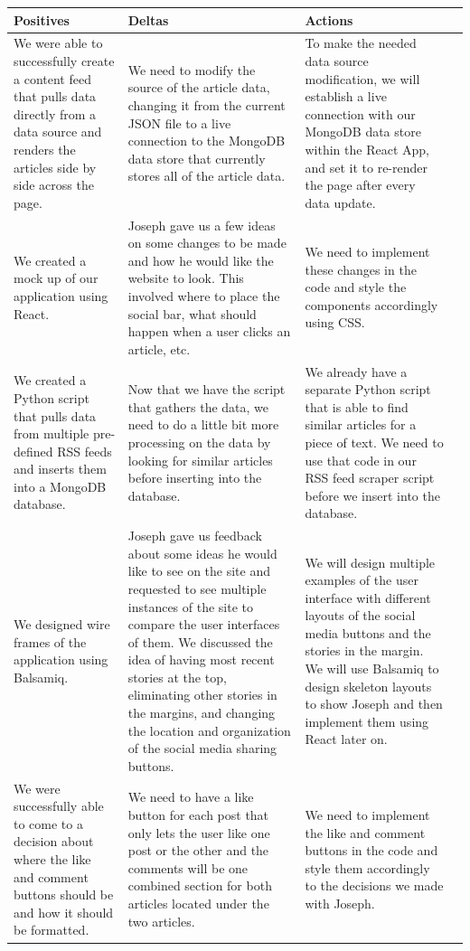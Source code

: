 \documentclass[onecolumn, draftclsnofoot,10pt, compsoc]{IEEEtran}
\begin{document}
\begin{table}[htbp]
    \centering
    \begin{tabularx}{1.05\textwidth}{| X | X | X | X |}
        \hline
        Positives & Deltas & Actions    \\ \hline
        We were able to successfully create a content feed that pulls data directly from a data source and renders the articles side by side across the page.
        & We need to modify the source of the article data, changing it from the current JSON file to a live connection to the MongoDB data store that currently stores all of the article data.
        & To make the needed data source modification, we will establish a live connection with our MongoDB data store within the React App, and set it to re-render the page after every data update. \\ \hline
        We created a mock up of our application using React. & Joseph gave us a few ideas on some changes to be made and how he would like the website to look. This involved where to place the social bar, what should happen when a user clicks an article, etc. & We need to implement these changes in the code and style the components accordingly using CSS. \\ \hline
        We created a Python script that pulls data from multiple pre-defined RSS feeds and inserts them into a MongoDB database. & Now that we have the script that gathers the data, we need to do a little bit more processing on the data by looking for similar articles before inserting into the database. & We already have a separate Python script that is able to find similar articles for a piece of text. We need to use that code in our RSS feed scraper script before we insert into the database. \\ \hline
        We designed wire frames of the application using Balsamiq. &Joseph gave us feedback about some ideas he would like to see on the site and requested to see multiple instances of the site to compare the user interfaces of them. We discussed the idea of having most recent stories at the top, eliminating other stories in the margins, and changing the location and organization of the social media sharing buttons. &We will design multiple examples of the user interface with different layouts of the social media buttons and the stories in the margin. We will use Balsamiq to design skeleton layouts to show Joseph and then implement them using React later on. \\ \hline
        We were successfully able to come to a decision about where the like and comment buttons should be and how it should be formatted. &We need to have a like button for each post that only lets the user like one post or the other and the comments will be one combined section for both articles located under the two articles. &We need to implement the like and comment buttons in the code and style them accordingly to the decisions we made with Joseph. \\ \hline

\end{tabularx}
\end{table}
\end{document}
